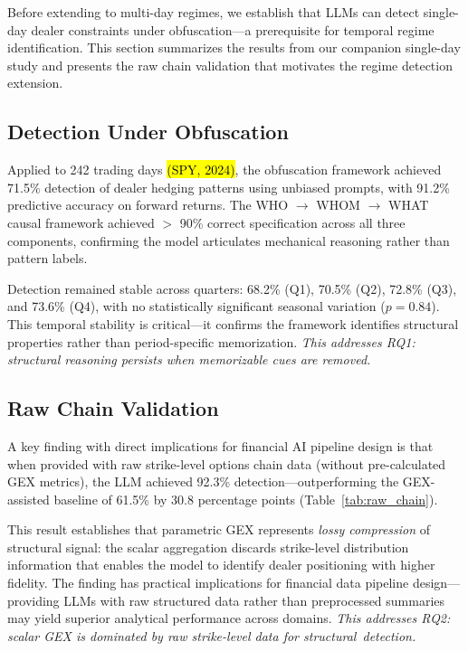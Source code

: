 \documentclass[jrfm,article,accept,moreauthors,pdftex]{Definitions/mdpi}
\begin{document}
Before extending to multi-day regimes, we establish that LLMs can detect single-day dealer constraints under obfuscation---a prerequisite for temporal regime identification. This section summarizes the results from our companion single-day study \citep{regan2025obfuscation} and presents the raw chain validation that motivates the regime detection extension.

\subsection{Detection Under Obfuscation}

Applied to 242 trading days \hl{(SPY, 2024)}, %
 the obfuscation framework achieved 71.5\% detection of dealer hedging patterns using unbiased prompts, with 91.2\% predictive accuracy on forward returns. The WHO $\rightarrow$ WHOM $\rightarrow$ WHAT causal framework achieved $>$ 90\% correct specification across all three components, confirming the model articulates mechanical reasoning rather than pattern labels.

Detection remained stable across quarters: 68.2\% (Q1), 70.5\% (Q2), 72.8\% (Q3), and 73.6\% (Q4), with no statistically significant seasonal variation ($p = 0.84$). This temporal stability is critical---it confirms the framework identifies structural properties rather than period-specific memorization. \textit{This addresses RQ1: structural reasoning persists when memorizable cues are removed.}

\subsection{Raw Chain Validation}
\label{subsec:raw_chain}

A key finding with direct implications for financial AI pipeline design is that when provided with raw strike-level options chain data (without pre-calculated GEX metrics), the LLM achieved 92.3\% detection---outperforming the GEX-assisted baseline of 61.5\% by 30.8 percentage points (Table~\ref{tab:raw_chain}).

This result establishes that parametric GEX represents \textit{lossy compression} of structural signal: the scalar aggregation discards strike-level distribution information that enables the model to identify dealer positioning with higher fidelity. The finding has practical implications for financial data pipeline design---providing LLMs with raw structured data rather than preprocessed summaries may yield superior analytical performance across domains. \textit{This addresses RQ2: scalar GEX is dominated by raw strike-level data for \mbox{structural detection.}}
\end{document}
